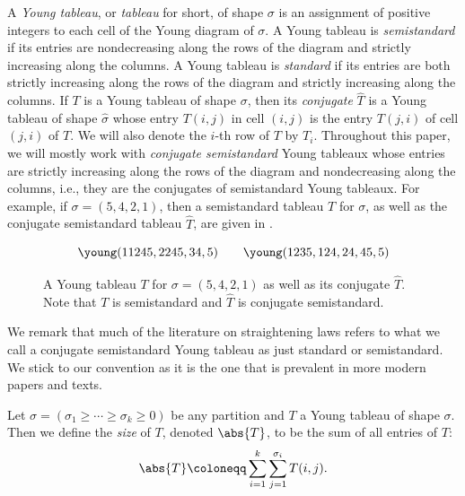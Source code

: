\documentclass[10pt,a4paper]{amsart}
\newcommand*\ie{i.e.}
\newcommand*\defeq{\coloneqq}
\begin{document}
\begin{defn}\label{defn:tableau}
    A \emph{Young tableau}, or \emph{tableau} for short, of shape $\sigma$ is an assignment of positive integers to each cell of the Young diagram of $\sigma$.
    A Young tableau is \emph{semistandard} if its entries are nondecreasing along the rows of the diagram and strictly increasing along the columns.
    A Young tableau is \emph{standard} if its entries are both strictly increasing along the rows of the diagram and strictly increasing along the columns.
    If $T$ is a Young tableau of shape $\sigma$, then its \emph{conjugate} $\widehat{T}$ is a Young tableau of shape $\widehat{\sigma}$ whose entry $T(i, j)$ in cell $(i, j)$ is the entry $T(j, i)$ of cell $(j, i)$ of $T$.
    We will also denote the $i$-th row of $T$ by $T_i$.
    Throughout this paper, we will mostly work with \emph{conjugate semistandard} Young tableaux whose entries are strictly increasing along the rows of the diagram and nondecreasing along the columns, \ie, they are the conjugates of semistandard Young tableaux.
    For example, if $\sigma = (5, 4, 2, 1)$, then a semistandard tableau $T$ for $\sigma$, as well as the conjugate semistandard tableau $\widehat{T}$, are given in .
    
    \begin{figure}[H]
        \centering
        \[
            \young(11245,2245,34,5) \qquad \young(1235,124,24,45,5)
        \]
        \caption{
            A Young tableau $T$ for $\sigma = (5, 4, 2, 1)$ as well as its conjugate $\widehat{T}$.
            Note that $T$ is semistandard and $\widehat{T}$ is conjugate semistandard.
        }\label{fig:young_tableau_ex}
    \end{figure}
    We remark that much of the literature on straightening laws refers to what we call a conjugate semistandard Young tableau as just standard or semistandard.
    We stick to our convention as it is the one that is prevalent in more modern papers and texts.
\end{defn}

\begin{defn}\label{defn:size_of_tab}
    Let $\sigma = (\sigma_1 \geq \cdots \geq \sigma_k \geq 0)$ be any partition and $T$ a Young tableau of shape $\sigma$.
    Then we define the \emph{size} of $T$, denoted $\abs{T}$, to be the sum of all entries of $T$:
    \[
        \abs{T} \defeq \sum_{i = 1}^k \sum_{j = 1}^{\sigma_i} T(i, j).
    \]
\end{defn}
\end{document}
